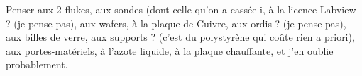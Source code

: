 Penser aux 2 flukes, aux sondes (dont celle qu'on a cassée ^^), à la licence Labview ? (je pense pas), aux wafers, à la plaque de Cuivre, aux ordis ? (je pense pas), aux billes de verre, aux supports ? (c'est du polystyrène qui coûte rien a priori), aux portes-matériels, à l'azote liquide, à la plaque chauffante, et j'en oublie probablement.
